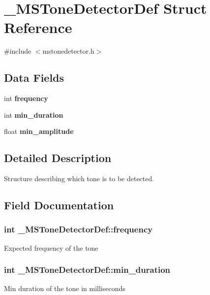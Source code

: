 \section{\-\_\-\-M\-S\-Tone\-Detector\-Def Struct Reference}
\label{struct__MSToneDetectorDef}


{\ttfamily \#include $<$mstonedetector.\-h$>$}

\subsection*{Data Fields}
\begin{DoxyCompactItemize}
\item 
int {\bf frequency}
\item 
int {\bf min\-\_\-duration}
\item 
float {\bf min\-\_\-amplitude}
\end{DoxyCompactItemize}


\subsection{Detailed Description}
Structure describing which tone is to be detected. 

\subsection{Field Documentation}
\subsubsection[{frequency}]{\setlength{\rightskip}{0pt plus 5cm}int \-\_\-\-M\-S\-Tone\-Detector\-Def\-::frequency}\label{struct__MSToneDetectorDef_a03b6327d9afaed82a4b5b5b2a6d86abb}
Expected frequency of the tone 
\subsubsection[{min\-\_\-duration}]{\setlength{\rightskip}{0pt plus 5cm}int \-\_\-\-M\-S\-Tone\-Detector\-Def\-::min\-\_\-duration}\label{struct__MSToneDetectorDef_a16f301fda5e31ee37ce0a7540d72d0ce}
Min duration of the tone in milliseconds 
